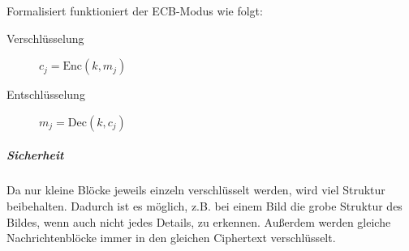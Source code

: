 \documentclass[a4paper, 11pt, accentcolor = tud3b]{tudreport}
\newcommand{\Enc}{\ensuremath{\textrm{Enc}}}
\newcommand{\Dec}{\ensuremath{\textrm{Dec}}}
\begin{document}
	                    Formalisiert funktioniert der ECB-Modus wie folgt:
	                    \begin{description}
	                    	\item[Verschlüsselung] \( c_j = \Enc(k, m_j) \)
	                    	\item[Entschlüsselung] \( m_j = \Dec(k, c_j) \)
	                    \end{description}
                    
						\subparagraph{Sicherheit}
							Da nur kleine Blöcke jeweils einzeln verschlüsselt werden, wird viel Struktur beibehalten. Dadurch ist es möglich, z.B. bei einem Bild die grobe Struktur des Bildes, wenn auch nicht jedes Details, zu erkennen. Außerdem werden gleiche Nachrichtenblöcke immer in den gleichen Ciphertext verschlüsselt.
\end{document}
